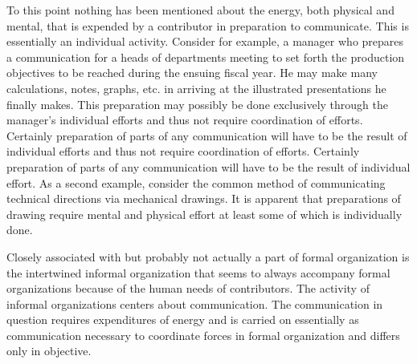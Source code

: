 To this point nothing has been mentioned about the energy, both physical and mental, that is expended by a contributor in preparation to communicate. This is essentially an individual activity. Consider for example, a manager who prepares a communication for a heads of departments meeting to set forth the production objectives to be reached during the ensuing fiscal year. He may make many calculations, notes, graphs, etc. in arriving at the illustrated presentations he finally makes. This preparation may possibly be done exclusively through the manager’s individual efforts and thus not require coordination of efforts. Certainly preparation of parts of any communication will have to be the result of individual efforts and thus not require coordination of efforts. Certainly preparation of parts of any communication will have to be the result of individual effort. As a second example, consider the common method of communicating technical directions via mechanical drawings. It is apparent that preparations of drawing require mental and physical effort at least some of which is individually done.

Closely associated with but probably not actually a part of formal organization is the intertwined informal organization that seems to always accompany formal organizations because of the human needs of contributors. The activity of informal organizations centers about communication. The communication in question requires expenditures of energy and is carried on essentially as communication necessary to coordinate forces in formal organization and differs only in objective.
